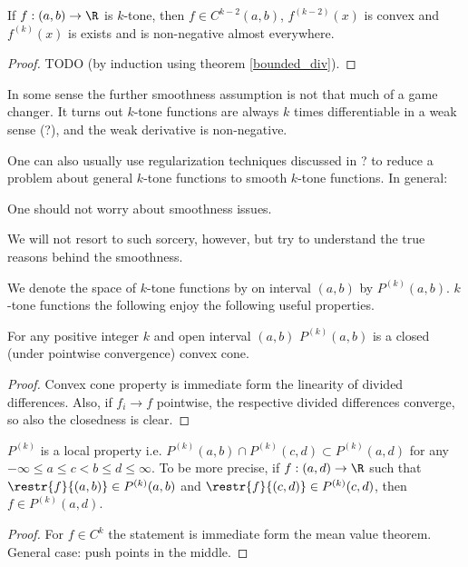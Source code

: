 \begin{lause}
	If $f : (a, b) \to \R$ is $k$-tone, then $f \in C^{k - 2}(a, b)$, $f^{(k - 2)}(x)$ is convex and $f^{(k)}(x)$ is exists and is non-negative almost everywhere.
\end{lause}

\begin{proof}
	TODO (by induction using theorem \ref{bounded_div}).
\end{proof}


In some sense the further smoothness assumption is not that much of a game changer. It turns out $k$-tone functions are always $k$ times differentiable in a weak sense (?), and the weak derivative is non-negative.

One can also usually use regularization techniques discussed in ? to reduce a problem about general $k$-tone functions to smooth $k$-tone functions. In general:

\begin{phil}
	One should not worry about smoothness issues.
\end{phil}

We will not resort to such sorcery, however, but try to understand the true reasons behind the smoothness.


We denote the space of $k$-tone functions by on interval $(a, b)$ by $P^{(k)}(a, b)$. $k$-tone functions the following enjoy the following useful properties.

\begin{prop}
	For any positive integer $k$ and open interval $(a, b)$ $P^{(k)}(a, b)$ is a closed (under pointwise convergence) convex cone.
\end{prop}
\begin{proof}
	Convex cone property is immediate form the linearity of divided differences. Also, if $f_{i} \to f$ pointwise, the respective divided differences converge, so also the closedness is clear.
\end{proof}

\begin{prop}
	$P^{(k)}$ is a local property i.e. $P^{(k)}(a, b) \cap P^{(k)}(c, d) \subset P^{(k)}(a, d)$ for any $-\infty \leq a \leq c < b \leq d \leq \infty$. To be more precise, if $f : (a, d) \to \R$ such that $\restr{f}{(a, b)} \in P^{(k)}(a, b)$ and $\restr{f}{(c, d)} \in P^{(k)}(c, d)$, then $f \in P^{(k)}(a, d)$.
\end{prop}
\begin{proof}
	For $f \in C^{k}$ the statement is immediate form the mean value theorem. General case: push points in the middle.
\end{proof}


